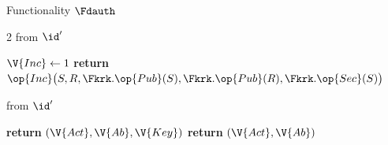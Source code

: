 \begin{interface}[nofloat]{Functionality $\Fdauth$ \\
}
{\begin{multicols}{2}
 \quad from $\id'$
\begin{algorithmic}[1]
\algcont
{} \label{ln:dauthonce}
 \label{ln:dauthhonest}
\State $\V{Inc} \gets 1$
\State \textbf{return} $\op{Inc}\bigl(S, R, \Fkrk.\op{Pub}(S), \Fkrk.\op{Pub}(R), \Fkrk.\op{Sec}(S)\bigr)$ \label{ln:dauthinc}
\algsave
\end{algorithmic}
\vspace{1.4ex}

 \quad from $\id'$
\begin{algorithmic}[1]
\algcont
{}
  \State \textbf{return} $(\V{Act}, \V{Ab}, \V{Key})$ \label{ln:dauthleakr}
\EndIf
\State \textbf{return} $(\V{Act}, \V{Ab})$ \label{ln:dauthleak}
\algsave
\end{algorithmic}
\end{multicols}}
\end{interface}
